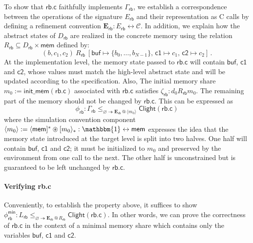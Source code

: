 \documentclass[acmsmall,screen,review,anonymous,nonacm]{acmart}
\newcommand{\kw}[1]{\ensuremath{ \mathsf{#1} }}
\newcommand{\sepconj}{\oast}
\begin{document}
\begin{example} %
To show that $\kw{rb.c}$
faithfully implements $\Gamma_\kw{rb}$,
we establish a correspondence
between the operations of the signature $E_\kw{rb}$
and their representation as C calls
by defining a refinement convention
$\mathbf{E}_\kw{rb} : E_\kw{rb} \leftrightarrow \mathcal{C}$.
In addition,
we explain how the abstract states of $D_\kw{rb}$
are realized in the concrete memory
using the relation
$R_\kw{rb} \subseteq D_\kw{rb} \times \kw{mem}$
defined by:
\[
  (b, c_1, c_2) \: \mathrel{R_\kw{rb}} \:
  [\kw{buf} \mapsto \{b_0, \ldots, b_{N-1}\}, \,
   \kw{c1} \mapsto c_1, \,
   \kw{c2} \mapsto c_2]
  \,.
\]
At the implementation level,
the memory state passed to $\kw{rb.c}$
will contain $\kw{buf}$, $\kw{c1}$ and $\kw{c2}$,
whose values must match the high-level abstract state
and will be updated according to the specification.
Also,
The initial memory share $m_0 := \kw{init\_mem}(\kw{rb.c})$
associated with $\kw{rb.c}$ satisfies
$\zeta_\kw{rb} : d_0 \mathrel{R_\kw{rb}} m_0$.
The remaining part of the memory should not be changed by $\kw{rb.c}$.
This can be expressed as
\begin{equation} \label{eqn:rbcorrect}
  \phi_\kw{rb} :
  \Gamma_\kw{rb}
  \le_{\varnothing \twoheadrightarrow
       \mathbf{E}_\kw{rb} \mathbin@ \langle m_0 \rangle }
  \kw{Clight}(\kw{rb.c})
\end{equation}
where the simulation convention component
$\langle m_0 \rangle :=
 \langle \kw{mem} ]^* \sepconj [m_0\rangle_* :
 \mathbbm{1} \leftrightarrow \kw{mem}$
expresses the idea that
the memory state introduced at the target level is split into two halves.
One half will contain $\kw{buf}$, $\kw{c1}$ and $\kw{c2}$;
it must be initialized to $m_0$
and preserved by the environment from one call to the next.
The other half is unconstrained
but is guaranteed to be left unchanged by $\kw{rb.c}$.
\end{example}

\paragraph{Verifying rb.c}Conveniently,
to establish the property above,
it suffices to show
$\phi_\kw{rb}^\kw{min} :
  L_\kw{rb}
  \le_{\varnothing \twoheadrightarrow \mathbf{E}_\kw{rb} \mathbin@ R_\kw{rb}}
  \kw{Clight}(\kw{rb.c})
$.
In other words,
we can prove the correctness of $\kw{rb.c}$
in the context of a minimal memory share
which contains only the variables $\kw{buf}$, $\kw{c1}$ and $\kw{c2}$.
\end{document}
